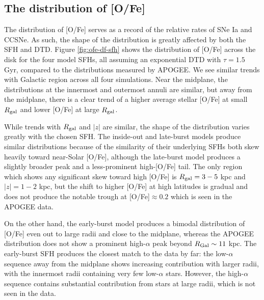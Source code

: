 \documentclass[twocolumn,twocolappendix,linenumbers,trackchanges]{aastex631}
\begin{document}

\subsection{The distribution of [O/Fe]}

The distribution of [O/Fe] serves as a record of the relative rates of SNe Ia and CCSNe. As such, the shape of the distribution is greatly affected by both the SFH and DTD. Figure \ref{fig:ofe-df-sfh} shows the distribution of [O/Fe] across the disk for the four model SFHs, all assuming an exponential DTD with $\tau=1.5$ Gyr, compared to the distributions measured by APOGEE. We see similar trends with Galactic region across all four simulations. Near the midplane, the distributions at the innermost and outermost annuli are similar, but away from the midplane, there is a clear trend of a higher average stellar [O/Fe] at small $R_{\rm gal}$ and lower [O/Fe] at large $R_{\rm gal}$.

While trends with $R_{\rm gal}$ and $|z|$ are similar, the shape of the distribution varies greatly with the chosen SFH. The inside-out and late-burst models produce similar distributions because of the similarity of their underlying SFHs \textemdash both skew heavily toward near-Solar [O/Fe], although the late-burst model produces a slightly broader peak and a less-prominent high-[O/Fe] tail. The only region which shows any significant skew toward high [O/Fe] is $R_{\rm gal}=3-5$ kpc and $|z|=1-2$ kpc, but the shift to higher [O/Fe] at high latitudes is gradual and does not produce the notable trough at [O/Fe]$\approx0.2$ which is seen in the APOGEE data. 

On the other hand, the early-burst model produces a bimodal distribution of [O/Fe] even out to large radii and close to the midplane, whereas the APOGEE distribution does not show a prominent high-$\alpha$ peak beyond $R_{\rm{Gal}}\sim11$ kpc. 
The early-burst SFH produces the closest match to the data by far: the low-$\alpha$ sequence away from the midplane shows increasing contribution with larger radii, with the innermost radii containing very few low-$\alpha$ stars. However, the high-$\alpha$ sequence contains substantial contribution from stars at large radii, which is not seen in the data.
\end{document}
